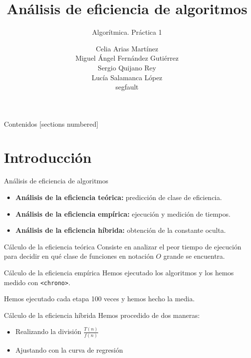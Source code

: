 \documentclass[10pt, xcolor=table]{beamer}
\title{Análisis de eficiencia de algoritmos}
\subtitle{Algorítmica. \alert{Práctica 1}}
\date{}
\author{Celia Arias Martínez\\Miguel Ángel Fernández Gutiérrez\\Sergio Quijano Rey\\Lucía Salamanca López\\[4pt]\footnotesize{segfault}}
\begin{document}
\maketitle

\begin{frame}{Contenidos}
	[sections numbered]
	\tableofcontents[]
\end{frame}


\section{Introducción}
\begin{frame}{Análisis de eficiencia de algoritmos}
\begin{itemize}
	\item \textbf{Análisis de la eficiencia teórica:} predicción de clase de eficiencia.
	\item \textbf{Análisis de la eficiencia empírica:} ejecución y medición de tiempos.
	\item \textbf{Análisis de la eficiencia híbrida:} obtención de la constante oculta.
\end{itemize}
\end{frame}
\begin{frame}{Cálculo de la eficiencia teórica}
Consiste en analizar el peor tiempo de ejecución para decidir en qué clase de funciones en notación $O$ grande se encuentra. 
\end{frame}

\begin{frame}{Cálculo de la eficiencia empírica}
Hemos ejecutado los algoritmos y los hemos medido con \texttt{<chrono>}. 

Hemos ejecutado cada etapa 100 veces y hemos hecho la media.
\end{frame}

\begin{frame}{Cálculo de la eficiencia híbrida}
Hemos procedido de dos maneras:
\begin{itemize}
	\item Realizando la división $\frac{T(n)}{f(n)}$
	\item Ajustando con la curva de regresión
\end{itemize}
\end{frame}
\end{document}
